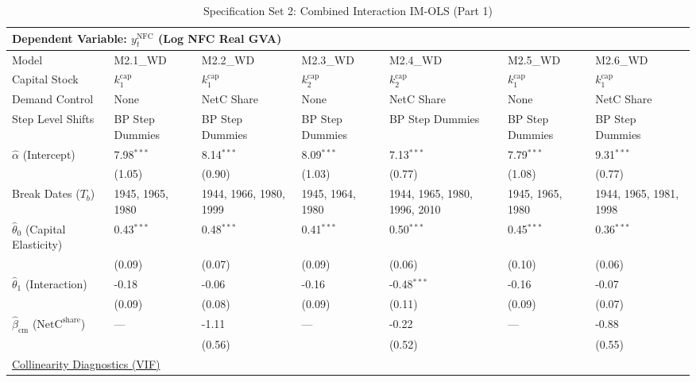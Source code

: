 \begin{table}[H]
\centering
\caption{Specification Set 2: Combined Interaction IM-OLS (Part 1)}
\label{tab:paper_spec_set_2_1}
\scriptsize
\begin{tabular}{p{3.8cm}p{1.35cm}p{1.35cm}p{1.35cm}p{1.35cm}p{1.35cm}p{1.35cm}}
\toprule
\multicolumn{7}{l}{\textbf{Dependent Variable: $y_t^{\text{NFC}}$ (Log NFC Real GVA)}} \\
\midrule
Model & M2.1\_WD & M2.2\_WD & M2.3\_WD & M2.4\_WD & M2.5\_WD & M2.6\_WD  \\
Capital Stock & $k^{\text{cap}}_1$ & $k^{\text{cap}}_1$ & $k^{\text{cap}}_2$ & $k^{\text{cap}}_2$ & $k^{\text{cap}}_1$ & $k^{\text{cap}}_1$  \\
Demand Control & None & NetC Share & None & NetC Share & None & NetC Share  \\
Step Level Shifts & BP Step Dummies & BP Step Dummies & BP Step Dummies & BP Step Dummies & BP Step Dummies & BP Step Dummies  \\
\midrule
$\hat{\alpha}$ (Intercept)  & 7.98$^{***}$ & 8.14$^{***}$ & 8.09$^{***}$ & 7.13$^{***}$ & 7.79$^{***}$ & 9.31$^{***}$  \\
 & {\scriptsize (1.05)} & {\scriptsize (0.90)} & {\scriptsize (1.03)} & {\scriptsize (0.77)} & {\scriptsize (1.08)} & {\scriptsize (0.77)}  \\
Break Dates ($T_b$) & 1945, 1965, 1980 & 1944, 1966, 1980, 1999 & 1945, 1964, 1980 & 1944, 1965, 1980, 1996, 2010 & 1945, 1965, 1980 & 1944, 1965, 1981, 1998  \\
[1ex]
$\hat{\theta}_0$ (Capital Elasticity)  & 0.43$^{***}$ & 0.48$^{***}$ & 0.41$^{***}$ & 0.50$^{***}$ & 0.45$^{***}$ & 0.36$^{***}$  \\
 & {\scriptsize (0.09)} & {\scriptsize (0.07)} & {\scriptsize (0.09)} & {\scriptsize (0.06)} & {\scriptsize (0.10)} & {\scriptsize (0.06)}  \\
$\hat{\theta}_1$ (Interaction)  & -0.18 & -0.06 & -0.16 & -0.48$^{***}$ & -0.16 & -0.07  \\
 & {\scriptsize (0.09)} & {\scriptsize (0.08)} & {\scriptsize (0.09)} & {\scriptsize (0.11)} & {\scriptsize (0.09)} & {\scriptsize (0.07)}  \\
$\hat{\beta}_{\text{cm}}$ ($\text{NetC}^{\text{share}}$)  & --- & -1.11 & --- & -0.22 & --- & -0.88  \\
 &  & {\scriptsize (0.56)} &  & {\scriptsize (0.52)} &  & {\scriptsize (0.55)}  \\
\midrule
\multicolumn{7}{l}{\underline{Collinearity Diagnostics (VIF)}} \\

\end{tabular}
\end{table}
